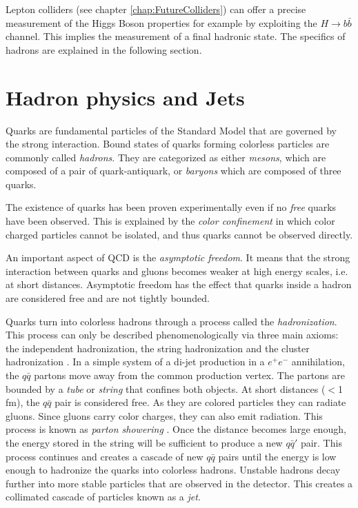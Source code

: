 Lepton colliders (see chapter \ref{chap:FutureColliders}) can offer a precise measurement of the Higgs Boson properties for example by exploiting the $H \rightarrow b\bar{b}$ channel. This implies the measurement of a final hadronic state. The specifics of hadrons are explained in the following section.

\section{Hadron physics and Jets}
\label{sec:Hadrons}

Quarks are fundamental particles of the Standard Model that are governed by the strong interaction. Bound states of quarks forming colorless particles are commonly called \textit{hadrons}. They are categorized as either \textit{mesons}, which are composed of a pair of quark-antiquark, or \textit{baryons} which are composed of three quarks.

The existence of quarks has been proven experimentally even if no \textit{free} quarks have been observed. This is explained by the \textit{color confinement} in which color charged particles cannot be isolated, and thus quarks cannot be observed directly.

An important aspect of QCD is the \textit{asymptotic freedom}. It means that the strong interaction between quarks and gluons becomes weaker at high energy scales, i.e. at short distances. Asymptotic freedom has the effect that quarks inside a hadron are considered free and are not tightly bounded.

Quarks turn into colorless hadrons through a process called the \textit{hadronization}. This process can only be described phenomenologically via three main axioms: the independent hadronization, the string hadronization \cite{Artru1988} and the cluster hadronization \cite{Webber:1983if}. In a simple system of a di-jet production in a $e^+e^-$ annihilation, the $q\bar{q}$ partons move away from the common production vertex. The partons are bounded by a \textit{tube} or \textit{string} that confines both objects. At short distances ($<$1 fm), the $q\bar{q}$ pair is considered free. As they are colored particles they can radiate gluons. Since gluons carry color charges, they can also emit radiation. This process is known as \textit{parton showering} \cite{Feynman:1969wa}. Once the distance becomes large enough, the energy stored in the string will be sufficient to produce a new $q\bar{q}'$ pair. This process continues and creates a cascade of new $q\bar{q}$ pairs until the energy is low enough to hadronize the quarks into colorless hadrons. Unstable hadrons decay further into more stable particles that are observed in the detector. This creates a collimated cascade of particles known as a \textit{jet}.

